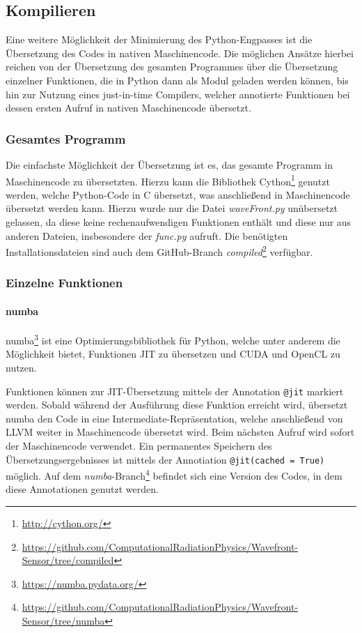 \subsection{Kompilieren}

Eine weitere Möglichkeit der Minimierung des Python-Engpasses ist die Übersetzung des Codes in nativen Maschinencode. Die möglichen Ansätze hierbei reichen von der Übersetzung des gesamten Programmes über die Übersetzung einzelner Funktionen, die in Python dann als Modul geladen werden können, bis hin zur Nutzung eines just-in-time Compilers, welcher annotierte Funktionen bei dessen ersten Aufruf in nativen Maschinencode übersetzt. 

\subsubsection{Gesamtes Programm}

Die einfachste Möglichkeit der Übersetzung ist es, das gesamte Programm in Maschinencode zu übersetzten. Hierzu kann die Bibliothek Cython\footnote{\url{http://cython.org/}} genutzt werden, welche Python-Code in C übersetzt, was anschließend in Maschinencode übersetzt werden kann. Hierzu wurde nur die Datei \textit{waveFront.py} unübersetzt gelassen, da diese keine rechenaufwendigen Funktionen enthält und diese nur aus anderen Dateien, insbesondere der \textit{func.py} aufruft. Die benötigten Installationsdateien sind auch dem GitHub-Branch \textit{compiled}\footnote{\url{https://github.com/ComputationalRadiationPhysics/Wavefront-Sensor/tree/compiled}} verfügbar. 

\subsubsection{Einzelne Funktionen}

\paragraph{numba}

numba\footnote{\url{https://numba.pydata.org/}} ist eine Optimierungsbibliothek für Python, welche unter anderem die Möglichkeit bietet, Funktionen \gls{JIT} zu übersetzen und CUDA und OpenCL zu nutzen. 

Funktionen können zur \gls{JIT}-Übersetzung mittels der Annotation \texttt{@jit} markiert werden. Sobald während der Ausführung diese Funktion erreicht wird, übersetzt numba den Code in eine Intermediate-Repräsentation, welche anschließend von LLVM weiter in Maschinencode übersetzt wird. Beim nächsten Aufruf wird sofort der Maschinencode verwendet. Ein permanentes Speichern des Übersetzungsergebnisses ist mittels der Annotiation \texttt{@jit(cached = True)} möglich. Auf dem \textit{numba}-Branch\footnote{\url{https://github.com/ComputationalRadiationPhysics/Wavefront-Sensor/tree/numba}} befindet sich eine Version des Codes, in dem diese Annotationen genutzt werden. 

